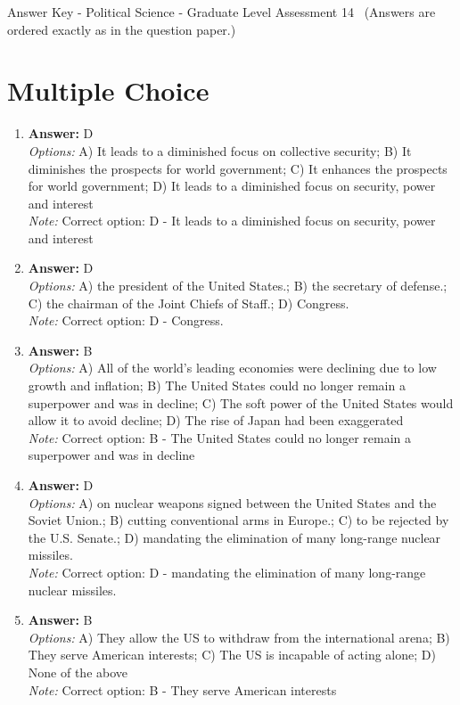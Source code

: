 \documentclass[12pt]{article}
\begin{document}
\begin{center}
Answer Key - Political Science - Graduate Level Assessment 14 \
\small (Answers are ordered exactly as in the question paper.)
\end{center}

\section*{Multiple Choice}
\begin{enumerate}[label=\arabic*.]
\item \textbf{Answer:} D
\\ \textit{Options:} A) It leads to a diminished focus on collective security; B) It diminishes the prospects for world government; C) It enhances the prospects for world government; D) It leads to a diminished focus on security, power and interest
\\ \textit{Note:} Correct option: D - It leads to a diminished focus on security, power and interest
\item \textbf{Answer:} D
\\ \textit{Options:} A) the president of the United States.; B) the secretary of defense.; C) the chairman of the Joint Chiefs of Staff.; D) Congress.
\\ \textit{Note:} Correct option: D - Congress.
\item \textbf{Answer:} B
\\ \textit{Options:} A) All of the world's leading economies were declining due to low growth and inflation; B) The United States could no longer remain a superpower and was in decline; C) The soft power of the United States would allow it to avoid decline; D) The rise of Japan had been exaggerated
\\ \textit{Note:} Correct option: B - The United States could no longer remain a superpower and was in decline
\item \textbf{Answer:} D
\\ \textit{Options:} A) on nuclear weapons signed between the United States and the Soviet Union.; B) cutting conventional arms in Europe.; C) to be rejected by the U.S. Senate.; D) mandating the elimination of many long-range nuclear missiles.
\\ \textit{Note:} Correct option: D - mandating the elimination of many long-range nuclear missiles.
\item \textbf{Answer:} B
\\ \textit{Options:} A) They allow the US to withdraw from the international arena; B) They serve American interests; C) The US is incapable of acting alone; D) None of the above
\\ \textit{Note:} Correct option: B - They serve American interests
\end{enumerate}
\end{document}
